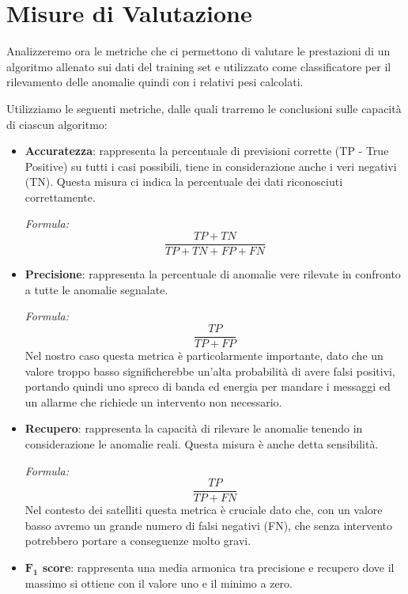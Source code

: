 \section{Misure di Valutazione}
Analizzeremo ora le metriche che ci permettono di valutare le prestazioni di un algoritmo allenato sui dati del training set e utilizzato come classificatore per il rilevamento delle anomalie quindi con i relativi pesi calcolati.

Utilizziamo le seguenti metriche, dalle quali trarremo le conclusioni sulle capacità di ciascun algoritmo: 
\begin{itemize}
    \item \textbf{Accuratezza}: rappresenta la percentuale di previsioni corrette (TP - True Positive) su tutti i casi possibili, tiene in considerazione anche i veri negativi (TN).
    Questa misura ci indica la percentuale dei dati riconosciuti correttamente. 
    
    \textit{Formula:}
        \begin{equation}
            \frac{TP+TN}{TP+TN+FP+FN}
        \end{equation}
    
    \item \textbf{Precisione}: rappresenta la percentuale di anomalie vere rilevate in confronto a tutte le anomalie segnalate.

    \textit{Formula:}
        \begin{equation}
            \frac{TP}{TP+FP}
        \end{equation}
    Nel nostro caso questa metrica è particolarmente importante, dato che un valore troppo basso significherebbe un'alta probabilità di avere falsi positivi, portando quindi uno spreco di banda ed energia per mandare i messaggi ed un allarme che richiede un intervento non necessario.

    \item \textbf{Recupero}: rappresenta la capacità di rilevare le anomalie tenendo in considerazione le anomalie reali. Questa misura è anche detta sensibilità.

    \textit{Formula:} 
    \begin{equation}
        \frac{TP}{TP+FN}
    \end{equation}
    Nel contesto dei satelliti questa metrica è cruciale dato che, con un valore basso avremo un grande numero di falsi negativi (FN), che senza intervento potrebbero portare a conseguenze molto gravi.
    
    \item \textbf{$\boldsymbol{F_1}$ score}: rappresenta una media armonica tra precisione e recupero dove il massimo si ottiene con il valore uno e il minimo a zero.


\end{itemize}

